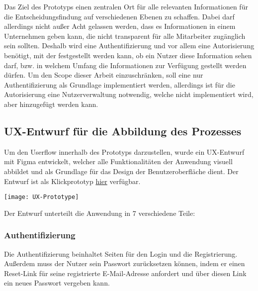 Das Ziel des Prototyps einen zentralen Ort für alle relevanten Informationen für die Entscheidungsfindung auf verschiedenen Ebenen zu schaffen. Dabei darf allerdings nicht außer Acht gelassen werden, dass es Informationen in einem Unternehmen geben kann, die nicht transparent für alle Mitarbeiter zugänglich sein sollten. Deshalb wird eine Authentifizierung und vor allem eine Autorisierung benötigt, mit der festgestellt werden kann, ob ein Nutzer diese Information sehen darf, bzw. in welchem Umfang die Informationen zur Verfügung gestellt werden dürfen. Um den Scope dieser Arbeit einzuschränken, soll eine nur Authentifizierung als Grundlage implementiert werden, allerdings ist für die Autorisierung eine Nutzerverwaltung notwendig, welche nicht implementiert wird, aber hinzugefügt werden kann.

\subsection{UX-Entwurf für die Abbildung des Prozesses}
Um den Userflow innerhalb des Prototyps darzustellen, wurde ein UX-Entwurf mit Figma entwickelt, welcher alle Funktionalitäten der Anwendung visuell abbildet und als Grundlage für das Design der Benutzeroberfläche dient. Der Entwurf ist als Klickprototyp \href{https://www.figma.com/proto/6TjaUCKvs4DjwzTDEiWxiO/Prototype?type=design&node-id=0-1&scaling=min-zoom&starting-point-node-id=2%3A61}{hier} verfügbar.

\vspace{20pt}
\begin{center}
    \begin{minipage}{\linewidth}
        \texttt{[image: UX-Prototype]}
    \end{minipage}
\end{center}
\vspace{20pt}


Der Entwurf unterteilt die Anwendung in 7 verschiedene Teile:

\subsubsection{Authentifizierung}
Die Authentifizierung beinhaltet Seiten für den Login und die Registrierung. Außerdem muss der Nutzer sein Passwort zurücksetzen können, indem er einen Reset-Link für seine registrierte E-Mail-Adresse anfordert und über diesen Link ein neues Passwort vergeben kann.

